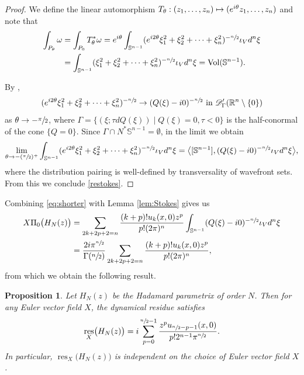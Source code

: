 \documentclass[10pt]{amsart}
\let\pazocal\mathscr
\newcommand{\Psfrac}[2]{(\sfrac{#1}{#2})}
\def\mto{\mathchoice{\longmapsto}{\mapsto}{\mapsto}{\mapsto}}
\newtheorem{proposition}[theorem]{Proposition}
\theoremstyle{definition}
\let\st\mid
\let\euler X
\let\Feuler V
\DeclareMathOperator{\resnorm}{res}
\DeclareMathOperator*{\Vol}{Vol}
\newcommand{\resdyn}{{\resnorm_\euler}}
\begin{document}
\begin{proof}
We define the linear automorphism
$ T_\theta: (z_1,\dots,z_n)\mto (e^{i\theta}z_1,\dots,z_n) $ and
note that
\[
\begin{aligned}
\int_{P_\theta} \omega&=\int_{P_0} T_\theta^*\omega=
e^{i\theta}\int_{\mathbb{S}^{n-1}}
(e^{i2\theta}\xi_1^2+\xi_2^2+\dots+\xi_n^2)^{-\sfrac{n}{2}} \iota_\Feuler d^n\xi \\ &=\int_{\mathbb{S}^{n-1}}
(\xi_1^2+\xi_2^2+\dots+\xi_n^2)^{-\sfrac{n}{2}} \iota_\Feuler d^n\xi=\Vol(\mathbb{S}^{n-1}).
\end{aligned}
\]

By \cite[Lem.\,D.1]{Dang2020},
\[
(e^{i2\theta}\xi_1^2+\xi_2^2+\dots+\xi_n^2)^{-\sfrac{n}{2}}\to (Q(\xi)-i0)^{-\sfrac{n}{2}} \text{ in } \pazocal{D}^\prime_\Gamma(\mathbb{R}^n\setminus \{0\})
\]
as $\theta\to -\sfrac{\pi}{2}$, where
$\Gamma=\{(\xi;\tau dQ(\xi)) \st Q(\xi)=0,\tau<0 \}$ is the half-conormal of the cone $\{Q=0\}$. Since $\Gamma\cap N^*\mathbb{S}^{n-1}=\emptyset$,
in the limit we obtain
\[
\lim_{\theta\to -\Psfrac{\pi}{2}^+} \int_{\mathbb{S}^{n-1}}
(e^{i2\theta}\xi_1^2+\xi_2^2+\dots+\xi_n^2)^{-\sfrac{n}{2}} \iota_\Feuler d^n\xi= \bigl\langle [\mathbb{S}^{n-1}], (Q(\xi)-i0)^{-\sfrac{n}{2}} \iota_\Feuler d^n\xi \bigr\rangle,
\]
where the distribution pairing is well-defined
by transversality of wavefront sets.
From this we conclude \eqref{restokes}.
\end{proof}

Combining \eqref{eq:shorter} with Lemma \ref{lem:Stokes} gives us
\begin{equation*}%
\begin{aligned}
\euler\Pi_0 \big(H_N(z)\big)&=\sum_{2k+2p+2=n }
\frac{(k+p)!u_k(x,0)z^p}{p!(2\pi)^n}\int_{\mathbb{S}^{n-1}}
(Q(\xi)-i0)^{-\sfrac{n}{2}} \iota_\Feuler d^n\xi\\
&=\frac{2i\pi^{\sfrac{n}{2}}}{\Gamma(\sfrac{n}{2})}\sum_{2k+2p+2=n }
\frac{(k+p)!u_k(x,0)z^p}{p!(2\pi)^n},
\end{aligned}
\end{equation*}
from which we obtain the following result.

\begin{proposition}
Let $H_N(z)$ be the Hadamard parametrix of order $N$. Then for any Euler vector field $\euler$, the
dynamical residue satisfies
\[
\resdyn \big(H_N(z)\big)=i\sum_{p=0}^{\sfrac{n}{2}-1}
\frac{z^pu_{\sfrac{n}{2}-p-1}(x,0)}{p! 2^{n-1}\pi^{\sfrac{n}{2}}}.
\]
In particular, $\resdyn \big(H_N(z)\big)$ is independent on the choice of Euler vector field $X$.
\end{proposition}
\end{document}

